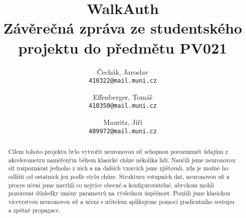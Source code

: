 \documentclass[a4paper, 10pt]{article}
\title{WalkAuth\\
\large Závěrečná zpráva ze studentského projektu do předmětu PV021
}
\author{Čechák, Jaroslav\\
	\texttt{410322@mail.muni.cz}
	\and
	Effenberger, Tomáš\\
	\texttt{410350@mail.muni.cz}
	\and
	Mauritz, Jiří\\
	\texttt{409972@mail.muni.cz}
}
\date{}
\begin{document}
\maketitle


\begin{abstract}
  Cílem tohoto projektu bylo vytvořit neuronovou síť schopnou porozumnět údajům z akcelerometru naměřeným během klasické chůze několika lidí. Naučili jsme neuronovou síť rozpoznávat jednoho z nich a na dalších vzorcích jsme zjišťovali, zda je možné ho odlišit od ostatních jen podle stylu chůze. Strukturu vstupních dat, neuronovou síť a proces učení jsme navrhli co nejvíce obecné a konfigurovatelné, abychom mohli pozorovat důsledky změny parametrů na výslednou úspěšnost. Použili jsme klasickou vícevrstvou neuronovou síť a učení s učitelem aplikujeme pomocí gradientního sestupu a zpětné propagace.
\end{abstract}
\end{document}
